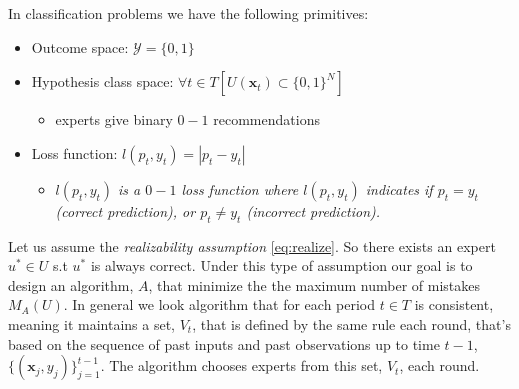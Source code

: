 \documentclass[11pt]{article}
\theoremstyle{quest}
\begin{document}
In classification problems we have the following primitives:
\begin{itemize}
	\item Outcome space: $\mathcal{Y} = \{0,1\}$
	\item Hypothesis class space: $\forall t\in T[U(\mathbf{x}_t)\subset \{0,1\}^N]$
	\begin{itemize}
		\item experts give binary $0-1$ recommendations
	\end{itemize}
	\item Loss function: $l(p_t,y_t)= |p_t-y_t|$
	\begin{itemize}
		\item \textit{$l(p_t,y_t)$ is a $0-1$ loss function where $l(p_t,y_t)$ indicates if $p_t = y_t $ (correct prediction), or $p_t\neq y_t$ (incorrect prediction). }
	\end{itemize} 
\end{itemize}
Let us assume the \textit{realizability assumption} {\color{blue} \eqref{eq:realize}}. So there exists an expert $u^*\in U$ s.t $u^*$ is always correct.  
Under this type of assumption our goal is to design an algorithm, $A$, that minimize the the maximum number of mistakes $M_{A}(U)$. In general we look algorithm that for each period $t\in T$ is consistent, meaning it maintains a set, $V_t$, that is defined by the same rule each round, that's based on the sequence of past inputs and past observations up to time $t-1$, $\{(\mathbf{x}_j,y_j)\}_{j=1}^{t-1}$. The algorithm chooses experts from this set, $V_t$, each round.\\ \\
%
%
\end{document}
